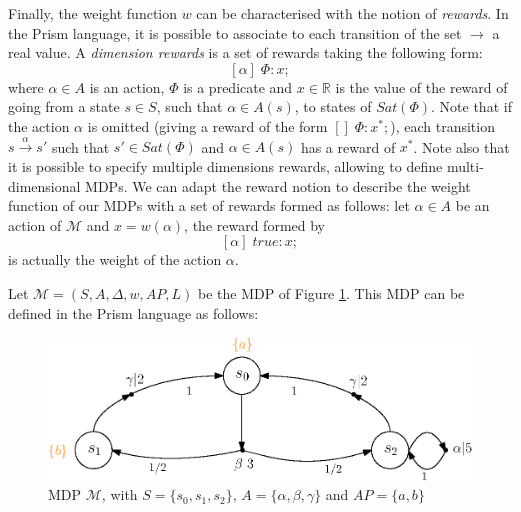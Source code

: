 Finally, the weight function $w$ can be characterised with the notion of \textit{rewards}. In the Prism language, it is possible to associate to each transition
of the set %
$\rightarrow$
a real value. A \textit{dimension rewards} is a set of rewards taking the following form:
\[
  [\alpha] \; \Phi: x;
\]
where $\alpha \in A$ is an action, $\Phi$ is a predicate and $x \in \mathbb{R}$
is the value of the reward of going from a state $s \in S$, such that $\alpha \in A(s)$, to states of $Sat(\Phi)$. Note that if the action $\alpha$ is omitted (giving a reward of the form $[]\; \Phi: x^*;$), each transition $s \xrightarrow{\,\alpha\,} s'$ such that $s' \in Sat(\Phi)$ and $\alpha \in A(s)$
has a reward of $x^*$. Note also that it is possible to specify multiple dimensions rewards, allowing to define multi-dimensional MDPs.
We can adapt the reward notion to describe the weight function of our MDPs with a set of rewards formed as follows:
let $\alpha \in A$ be an action of $\mathcal{M}$ and $x = w(\alpha)$, the reward formed by
\[
  [\alpha] \; true: x;
\]
is actually the weight of the action $\alpha$.

\begin{example}
Let $\mathcal{M}=(S, A, \Delta, w, AP, L)$ be the MDP of Figure \ref{prism-simple}. This MDP can be defined in the Prism language as follows:
\begin{figure}[h!]
\begin{minipage}{0.4\linewidth}
  
\end{minipage}
\begin{minipage}{0.6\linewidth}
    \includegraphics[width=\linewidth]{resources/simple-mdp}
\end{minipage}
\captionsetup{justification=centering}
\caption{MDP $\mathcal{M}$, with $S = \{s_0, s_1, s_2\}$, $A = \{\alpha, \beta, \gamma\}$ and $AP = \{a, b\}$}\label{prism-simple}
\end{figure}
\end{example}

